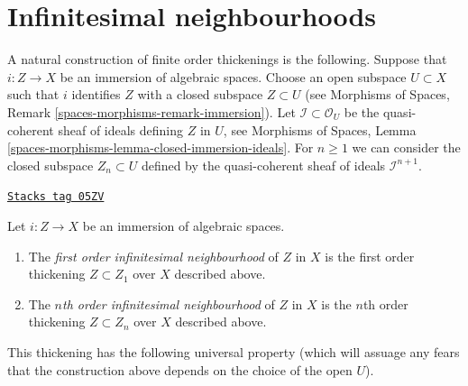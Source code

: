 \section{Infinitesimal neighbourhoods}
\label{spaces-more-morphisms-section-first-order-infinitesimal-neighbourhood}
A natural construction of finite order thickenings is the following.
Suppose that $i : Z \to X$ be an immersion of algebraic spaces. Choose an
open subspace $U \subset X$ such that $i$ identifies $Z$ with a closed
subspace $Z \subset U$ (see
Morphisms of Spaces, Remark \ref{spaces-morphisms-remark-immersion}).
Let $\mathcal{I} \subset \mathcal{O}_U$ be the
quasi-coherent sheaf of ideals defining $Z$ in $U$, see
Morphisms of Spaces,
Lemma \ref{spaces-morphisms-lemma-closed-immersion-ideals}.
For $n \geq 1$ we can consider the closed subspace $Z_n \subset U$
defined by the quasi-coherent sheaf of ideals $\mathcal{I}^{n + 1}$.

\begin{definition}
\label{spaces-more-morphisms-definition-first-order-infinitesimal-neighbourhood}
\href{https://stacks.math.columbia.edu/tag/05ZV}{\texttt{Stacks tag 05ZV}}

Let $i : Z \to X$ be an immersion of algebraic spaces.
\begin{enumerate}
\item The {\it first order infinitesimal neighbourhood} of $Z$ in $X$ is
the first order thickening $Z \subset Z_1$ over $X$ described above.
\item The {\it $n$th order infinitesimal neighbourhood} of $Z$ in $X$ is
the $n$th order thickening $Z \subset Z_n$ over $X$ described above.
\end{enumerate}
\end{definition}

This thickening has the following universal property (which will assuage
any fears that the construction above depends on the choice of the open
$U$).

